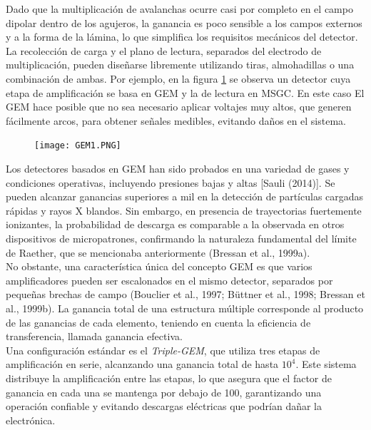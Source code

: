 \documentclass{article}
\begin{document}
\noindent Dado que la multiplicación de avalanchas ocurre casi por completo en el campo dipolar dentro de los agujeros, la ganancia es poco sensible a los campos externos y a la forma de la lámina, lo que simplifica los requisitos mecánicos del detector. La recolección de carga y el plano de lectura, separados del electrodo de multiplicación, pueden diseñarse libremente utilizando tiras, almohadillas o una combinación de ambas. Por ejemplo, en la figura \ref{fig:gem_MSGC} se observa un detector cuya etapa de amplificación se basa en GEM y la de lectura en MSGC. En este caso El GEM hace posible que no sea necesario aplicar voltajes muy altos, que generen fácilmente arcos, para obtener señales medibles, evitando daños en el sistema. 

\begin{figure}[H]
    \centering
    \texttt{[image: GEM1.PNG]}
    \caption{}
    \label{fig:gem_MSGC}
\end{figure}


\noindent Los detectores basados en GEM han sido probados en una variedad de gases y condiciones operativas, incluyendo presiones bajas y altas [Sauli (2014)]. Se pueden alcanzar ganancias superiores a mil en la detección de partículas cargadas rápidas y rayos X blandos. Sin embargo, en presencia de trayectorias fuertemente ionizantes, la probabilidad de descarga es comparable a la observada en otros dispositivos de micropatrones, confirmando la naturaleza fundamental del límite de Raether, que se mencionaba anteriormente (Bressan et al., 1999a).\\

\noindent No obstante, una característica única del concepto GEM es que varios amplificadores pueden ser escalonados en el mismo detector, separados por pequeñas brechas de campo (Bouclier et al., 1997; Büttner et al., 1998; Bressan et al., 1999b). La ganancia total de una estructura múltiple corresponde al producto de las ganancias de cada elemento, teniendo en cuenta la eficiencia de transferencia, llamada ganancia efectiva.\\

\noindent Una configuración estándar es el \textit{Triple-GEM}, que utiliza tres etapas de amplificación en serie, alcanzando una ganancia total de hasta $10^4$. Este sistema distribuye la amplificación entre las etapas, lo que asegura que el factor de ganancia en cada una se mantenga por debajo de 100, garantizando una operación confiable y evitando descargas eléctricas que podrían dañar la electrónica.\\
\end{document}
